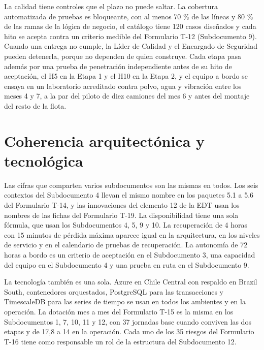 La calidad tiene controles que el plazo no puede saltar. La cobertura automatizada de pruebas es bloqueante, con al
menos 70 \% de las líneas y 80 \% de las ramas de la lógica de negocio, el catálogo tiene 120 casos
diseñados y cada hito se acepta contra un criterio medible del Formulario T-12 (Subdocumento 9). Cuando
una entrega no cumple, la Líder de Calidad y el Encargado de Seguridad pueden detenerla, porque no
dependen de quien construye. Cada etapa pasa además por una prueba de penetración independiente antes
de su hito de aceptación, el H5 en la Etapa 1 y el H10 en la Etapa 2, y el equipo a bordo se ensaya en
un laboratorio acreditado contra polvo, agua y vibración entre los meses 4 y 7, a la par del piloto de
diez camiones del mes 6 y antes del montaje del resto de la flota.

\section{Coherencia arquitectónica y tecnológica}\label{sec:14-coherencia-arquitectonica-y-tecn}

Las cifras que comparten varios subdocumentos son las mismas en todos. Los seis contextos del
Subdocumento 4 llevan el mismo nombre en los paquetes 5.1 a 5.6 del Formulario T-14, y las innovaciones
del elemento 12 de la EDT usan los nombres de las fichas del Formulario T-19. La disponibilidad tiene una sola
fórmula, que usan los Subdocumentos 4, 5, 9 y 10. La recuperación de 4 horas con 15 minutos de pérdida
máxima aparece igual en la arquitectura, en los niveles de servicio y en el calendario de pruebas de
recuperación. La autonomía de 72 horas a bordo es un criterio de aceptación en el Subdocumento 3, una
capacidad del equipo en el Subdocumento 4 y una prueba en ruta en el Subdocumento 9.

La tecnología también es una sola. Azure en Chile Central con respaldo en Brazil South, contenedores
orquestados, PostgreSQL para las transacciones y TimescaleDB para las series de tiempo se usan en todos
los ambientes y en la operación. La dotación mes a mes del Formulario T-15 es la misma en los
Subdocumentos 1, 7, 10, 11 y 12, con 37 jornadas base cuando conviven las dos etapas y de 17,8 a 14 en
la operación. Cada uno de los 35 riesgos del
Formulario T-16 tiene como responsable un rol de la estructura del Subdocumento 12.


